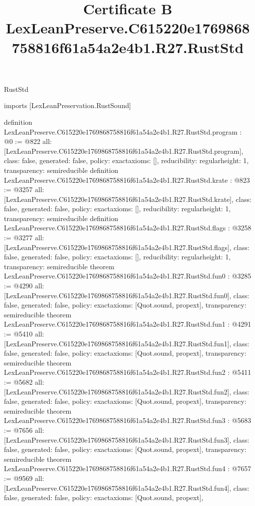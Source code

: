 \begin{lexlean}{RustStd}
\title{Certificate B LexLeanPreserve.C615220e1769868758816f61a54a2e4b1.R27.RustStd}
\begin{coremodule}
imports [LexLeanPreservation.RustSound]

definition LexLeanPreserve.C615220e1769868758816f61a54a2e4b1.R27.RustStd.program : @0 := @822 {
  all: [LexLeanPreserve.C615220e1769868758816f61a54a2e4b1.R27.RustStd.program],
  class: false,
  generated: false,
  policy: exact{axioms: []},
  reducibility: regular{height: 1},
  transparency: semireducible
}
definition LexLeanPreserve.C615220e1769868758816f61a54a2e4b1.R27.RustStd.krate : @823 := @3257 {
  all: [LexLeanPreserve.C615220e1769868758816f61a54a2e4b1.R27.RustStd.krate],
  class: false,
  generated: false,
  policy: exact{axioms: []},
  reducibility: regular{height: 1},
  transparency: semireducible
}
definition LexLeanPreserve.C615220e1769868758816f61a54a2e4b1.R27.RustStd.flags : @3258 := @3277 {
  all: [LexLeanPreserve.C615220e1769868758816f61a54a2e4b1.R27.RustStd.flags],
  class: false,
  generated: false,
  policy: exact{axioms: []},
  reducibility: regular{height: 1},
  transparency: semireducible
}
theorem LexLeanPreserve.C615220e1769868758816f61a54a2e4b1.R27.RustStd.fun0 : @3285 := @4290 {
  all: [LexLeanPreserve.C615220e1769868758816f61a54a2e4b1.R27.RustStd.fun0],
  class: false,
  generated: false,
  policy: exact{axioms: [Quot.sound, propext]},
  transparency: semireducible
}
theorem LexLeanPreserve.C615220e1769868758816f61a54a2e4b1.R27.RustStd.fun1 : @4291 := @5410 {
  all: [LexLeanPreserve.C615220e1769868758816f61a54a2e4b1.R27.RustStd.fun1],
  class: false,
  generated: false,
  policy: exact{axioms: [Quot.sound, propext]},
  transparency: semireducible
}
theorem LexLeanPreserve.C615220e1769868758816f61a54a2e4b1.R27.RustStd.fun2 : @5411 := @5682 {
  all: [LexLeanPreserve.C615220e1769868758816f61a54a2e4b1.R27.RustStd.fun2],
  class: false,
  generated: false,
  policy: exact{axioms: [Quot.sound, propext]},
  transparency: semireducible
}
theorem LexLeanPreserve.C615220e1769868758816f61a54a2e4b1.R27.RustStd.fun3 : @5683 := @7656 {
  all: [LexLeanPreserve.C615220e1769868758816f61a54a2e4b1.R27.RustStd.fun3],
  class: false,
  generated: false,
  policy: exact{axioms: [Quot.sound, propext]},
  transparency: semireducible
}
theorem LexLeanPreserve.C615220e1769868758816f61a54a2e4b1.R27.RustStd.fun4 : @7657 := @9569 {
  all: [LexLeanPreserve.C615220e1769868758816f61a54a2e4b1.R27.RustStd.fun4],
  class: false,
  generated: false,
  policy: exact{axioms: [Quot.sound, propext]},
}
\end{coremodule}
\end{lexlean}
